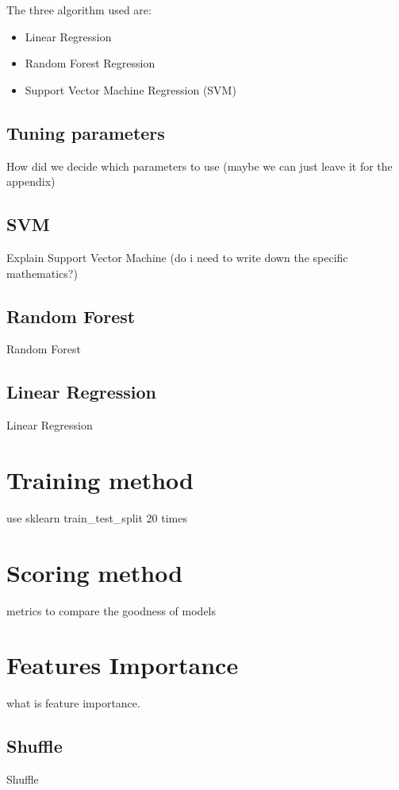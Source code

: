 The three algorithm used are:
\begin{itemize}
	\item Linear Regression
	\item Random Forest Regression
	\item Support Vector Machine Regression (SVM)
\end{itemize}

\subsection{Tuning parameters}
How did we decide which parameters to use (maybe we can just leave it for the appendix)

\subsection{SVM}
Explain Support Vector Machine (do i need to write down the specific mathematics?)

\subsection{Random Forest}
Random Forest

\subsection{Linear Regression}
Linear Regression

\section{Training method}\label{training}
use sklearn train\_test\_split 20 times

\section{Scoring method}\label{scoring}
metrics to compare the goodness of models

\section{Features Importance}\label{featuresimp}
what is feature importance.

\subsection{Shuffle}
Shuffle

